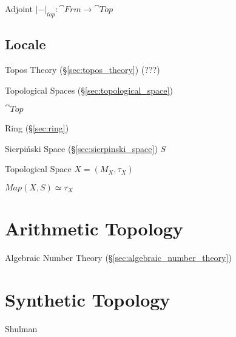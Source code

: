 Adjoint $|-|_{top} : \cat{Frm} \rightarrow \cat{Top}$ %



\subsection{Locale}\label{sec:locale}

Topos Theory (\S\ref{sec:topos_theory}) (???)

Topological Spaces (\S\ref{sec:topological_space})

$\cat{Top}$

Ring (\S\ref{sec:ring})

Sierpi\'nski Space (\S\ref{sec:sierpinski_space}) $S$

Topological Space $X = (M_X,\tau_X)$

$Map(X,S) \simeq \tau_X$



\section{Arithmetic Topology}\label{sec:arithmetic_topology}

Algebraic Number Theory (\S\ref{sec:algebraic_number_theory})



\section{Synthetic Topology}\label{sec:synthetic_topology}

\fist Shulman
